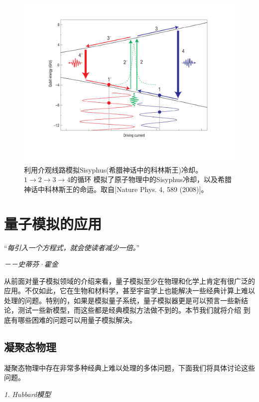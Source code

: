 \begin{figure}[htbp]
            \begin{center}
              \includegraphics[width= 0.8\columnwidth]{figures/supersim.pdf}
              \caption{利用介观线路模拟Sisyphus(希腊神话中的科林斯王)冷却。$1\longrightarrow2\longrightarrow3\longrightarrow4$的循环
              模拟了原子物理中的Sisyphus冷却，以及希腊神话中科林斯王的命运。取自[Nature Phys. 4, 589 (2008)\cite{supersim5}]。
              }
              \label{supersim}
            \end{center}
\end{figure}

 \section{量子模拟的应用}

  “\emph{每引入一个方程式，就会使读者减少一倍。}”

 \hspace{23em} \emph{－－史蒂芬·霍金}

从前面对量子模拟领域的介绍来看，量子模拟至少在物理和化学上肯定有很广泛的应用。不仅如此，它在生物和材料学，甚至宇宙学上也能解决一些经典计算上难以
处理的问题。特别的，如果是模拟量子系统，量子模拟器更是可以预言一些新结论，测试一些新模型，而这些都是经典模拟方法做不到的。本节我们就将介绍
到底有哪些困难的问题可以用量子模拟解决。

 \subsection{凝聚态物理}

 凝聚态物理中存在非常多种经典上难以处理的多体问题，下面我们将具体讨论这些问题。

 \emph{1. Hubbard模型}

